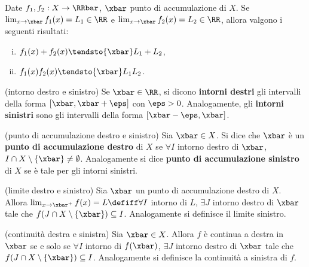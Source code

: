 \documentclass[11pt]{article}
\begin{document}
	\begin{proposition}
		Date $f_1, f_2 : X \to \RRbar$, $\xbar$ punto di accumulazione
		di $X$. Se $\lim_{x \to \xbar} f_1(x) = L_1 \in \RR$ e
		$\lim_{x \to \xbar} f_2(x) = L_2 \in \RR$, allora valgono
		i seguenti risultati:
		
		\begin{enumerate}[(i)]
			\item $f_1(x) + f_2(x) \tendsto{\xbar} L_1 + L_2$,
			\item $f_1(x) f_2(x) \tendsto{\xbar} L_1 L_2$.
		\end{enumerate}
	\end{proposition}

	\begin{definition}
		(intorno destro e sinistro) Se $\xbar \in \RR$, si dicono
		\textbf{intorni destri} gli intervalli della forma $[\xbar, \xbar + \eps]$ con
		$\eps > 0$. Analogamente, gli \textbf{intorni sinistri} sono gli
		intervalli della forma $[\xbar - \eps, \xbar]$.
	\end{definition}

	\begin{definition}
		(punto di accumulazione destro e sinistro) Sia $\xbar \in X$.
		Si dice che $\xbar$ è un \textbf{punto di accumulazione destro}
		di $X$ se $\forall I$ intorno destro di $\xbar$, $I \cap X \setminus \{\xbar\} \neq \emptyset$. Analogamente si dice \textbf{punto di
		accumulazione sinistro} di $X$ se è tale per gli intorni sinistri.
	\end{definition}

	\begin{definition}
		(limite destro e sinistro) Sia $\xbar$ un punto di accumulazione
		destro di $X$. Allora $\lim_{x \to \xbar^+} f(x) = L \defiff \forall I$
		intorno di $L$, $\exists J$ intorno destro di $\xbar$ tale che
		$f(J \cap X \setminus \{\xbar\}) \subseteq I$. Analogamente si definisce
		il limite sinistro.
	\end{definition}

	\begin{definition}
		(continuità destra e sinistra) Sia $\xbar \in X$. Allora $f$ è continua
		a destra in $\xbar$ se e solo se $\forall I$ intorno di $f(\xbar)$,
		$\exists J$ intorno destro di $\xbar$ tale che $f(J \cap X \setminus \{\xbar\}) \subseteq I$. Analogamente si definisce la continuità
		a sinistra di $f$.
	\end{definition}

	
\end{document}
